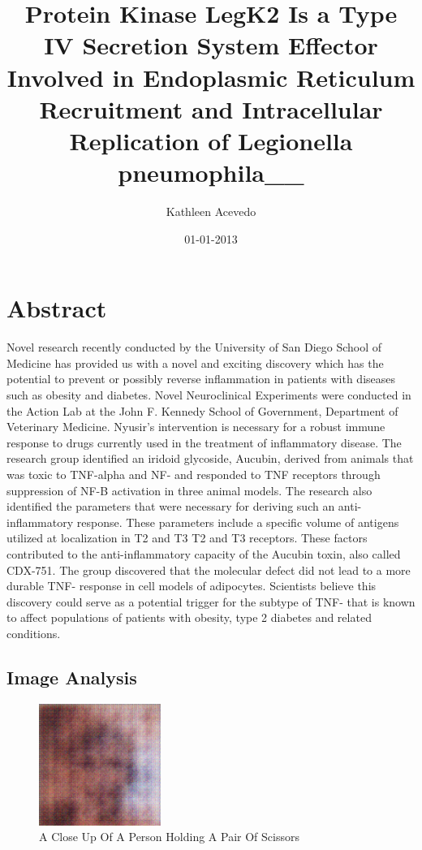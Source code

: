 \documentclass{article}%
\title{Protein Kinase LegK2 Is a Type IV Secretion System Effector Involved in Endoplasmic Reticulum Recruitment and Intracellular Replication of Legionella pneumophila\_\_}%
\author{Kathleen Acevedo}%
\affil{Zhang Zhongjing College of Chinese Medicine, Nanyang Institute of Technology, China}%
\date{01{-}01{-}2013}%
\begin{document}
%
\normalsize%
\maketitle%
\section{Abstract}%
\label{sec:Abstract}%
Novel research recently conducted by the University of San Diego School of Medicine has provided us with a novel and exciting discovery which has the potential to prevent or possibly reverse inflammation in patients with diseases such as obesity and diabetes. Novel Neuroclinical Experiments were conducted in the Action Lab at the John F. Kennedy School of Government, Department of Veterinary Medicine.\newline%
Nyusir's intervention is necessary for a robust immune response to drugs currently used in the treatment of inflammatory disease.\newline%
The research group identified an iridoid glycoside, Aucubin, derived from animals that was toxic to TNF{-}alpha and NF{-} and responded to TNF receptors through suppression of NF{-}B activation in three animal models. The research also identified the parameters that were necessary for deriving such an anti{-}inflammatory response. These parameters include a specific volume of antigens utilized at localization in T2 and T3 T2 and T3 receptors. These factors contributed to the anti{-}inflammatory capacity of the Aucubin toxin, also called CDX{-}751. The group discovered that the molecular defect did not lead to a more durable TNF{-} response in cell models of adipocytes.\newline%
Scientists believe this discovery could serve as a potential trigger for the subtype of TNF{-} that is known to affect populations of patients with obesity, type 2 diabetes and related conditions.

%
\subsection{Image Analysis}%
\label{subsec:ImageAnalysis}%


\begin{figure}[h!]%
\centering%
\includegraphics[width=150px]{500_fake_images/samples_5_45.png}%
\caption{A Close Up Of A Person Holding A Pair Of Scissors}%
\end{figure}

%
\end{document}
